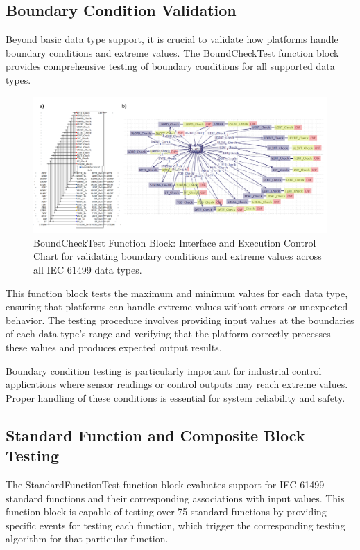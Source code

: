 \subsection{Boundary Condition Validation}

Beyond basic data type support, it is crucial to validate how platforms handle boundary conditions and extreme values. The BoundCheckTest function block provides comprehensive testing of boundary conditions for all supported data types.

\begin{figure}[!htbp]
    \centering
    \includegraphics[width=0.9\columnwidth]{MX_Papers/Paper8/Figures/BCT4Diac.PNG}
    \caption{BoundCheckTest Function Block: Interface and Execution Control Chart for validating boundary conditions and extreme values across all IEC 61499 data types.}
    \label{fig:boundary_test}
\end{figure}

This function block tests the maximum and minimum values for each data type, ensuring that platforms can handle extreme values without errors or unexpected behavior. The testing procedure involves providing input values at the boundaries of each data type's range and verifying that the platform correctly processes these values and produces expected output results.

Boundary condition testing is particularly important for industrial control applications where sensor readings or control outputs may reach extreme values. Proper handling of these conditions is essential for system reliability and safety.

\subsection{Standard Function and Composite Block Testing}

The StandardFunctionTest function block evaluates support for IEC 61499 standard functions and their corresponding associations with input values. This function block is capable of testing over 75 standard functions by providing specific events for testing each function, which trigger the corresponding testing algorithm for that particular function.

